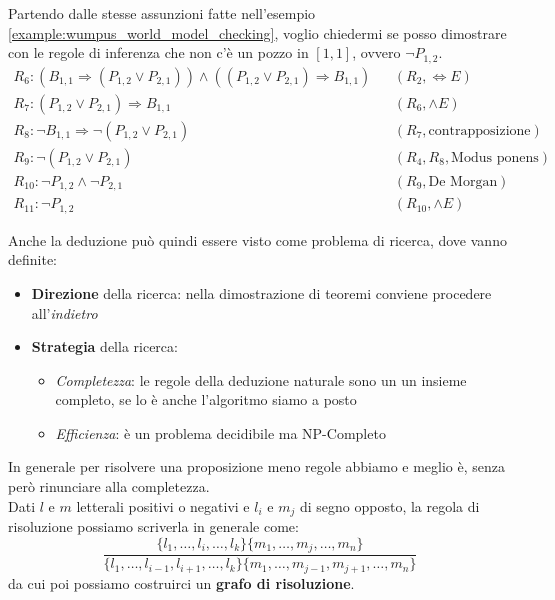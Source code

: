 \begin{example}[Wumpus]
	Partendo dalle stesse assunzioni fatte nell'esempio \ref{example:wumpus_world_model_checking}, voglio chiedermi se posso dimostrare con le regole di inferenza che non c'è un pozzo in $[1,1]$, ovvero $\neg P_{1,2}$.
	\begin{align*}
		R_6: (B_{1,1} \Rightarrow (P_{1,2} \lor P_{2,1})) \land ((P_{1,2} \lor P_{2,1}) \Rightarrow B_{1,1}) && (R_2, \Leftrightarrow E) \\
		R_7: (P_{1,2} \lor P_{2,1}) \Rightarrow B_{1,1} && (R_6,\land E)\\
		R_8: \neg B_{1,1} \Rightarrow \neg (P_{1,2} \lor P_{2,1}) && (R_7, \text{contrapposizione}) \\
		R_9: \neg(P_{1,2} \lor P_{2,1}) && (R_4, R_8, \text{Modus ponens}) \\
		R_{10}: \neg P_{1,2} \land \neg P_{2,1} && (R_9, \text{De Morgan})\\
		R_{11}: \neg P_{1,2} && (R_10, \land E)
	\end{align*}
\end{example}
\noindent Anche la deduzione può quindi essere visto come problema di ricerca, dove vanno definite:
\begin{itemize}
	\item \textbf{Direzione} della ricerca: nella dimostrazione di teoremi conviene procedere all'\textit{indietro}
	\item \textbf{Strategia} della ricerca:
	\begin{itemize}
		\item \textit{Completezza}: le regole della deduzione naturale sono un un insieme completo, se lo è anche l'algoritmo siamo a posto
		\item \textit{Efficienza}: è un problema decidibile ma NP-Completo
	\end{itemize}
\end{itemize}
In generale per risolvere una proposizione meno regole abbiamo e meglio è, senza però rinunciare alla completezza.\\
Dati $l$ e $m$ letterali positivi o negativi e $l_i$ e $m_j$ di segno opposto, la regola di risoluzione possiamo scriverla in generale come:
\begin{equation}
	\frac{\{l_1, \ldots, l_i, \ldots, l_k\}\{m_1, \ldots, m_j, \ldots, m_n\}}{\{l_1, \ldots, l_{i-1}, l_{i+1}, \ldots, l_k\}\{m_1, \ldots, m_{j-1}, m_{j+1}, \ldots, m_n\}}
\end{equation}
da cui poi possiamo costruirci un \textbf{grafo di risoluzione}.

